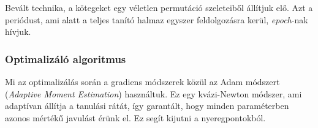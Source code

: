 

Bevált technika, a kötegeket egy véletlen permutáció szeleteiből állítjuk elő.
Azt a periódust, ami alatt a teljes tanító halmaz egyszer feldolgozásra kerül, \textit{epoch}-nak hívjuk.




%
%
%
%
%
%
%
%
%
%
%
%
%
%
%
%



\subsubsection{Optimalizáló algoritmus}
\label{sec:adam}

Mi az optimalizálás során a gradiens módszerek közül az Adam módszert (\textit{Adaptive Moment Estimation}) \cite{kingma2014adam}  használtuk. Ez egy kvázi-Newton módszer, ami adaptívan állítja a tanulási rátát, így garantált, hogy minden paraméterben azonos mértékű javulást érünk el. Ez segít kijutni a nyeregpontokból.

